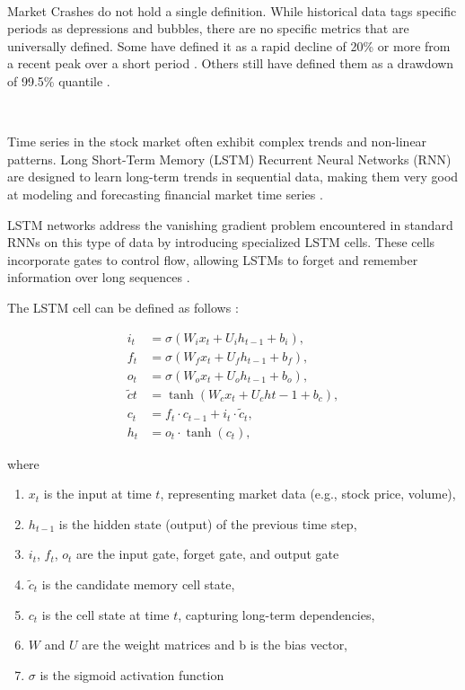\documentclass[12pt, letterpaper]{article}
\begin{document}
    \

    Market Crashes do not hold a single definition. While historical data tags specific periods as depressions and bubbles, there are no specific metrics that are universally defined. Some have defined it as a rapid decline of 20\% or more from a recent peak over a short period \cite{Fonville, Investo}. Others still have defined them as a drawdown of 99.5\% quantile \cite{99.5quantile}.
    
    \
    
    Time series in the stock market often exhibit complex trends and non-linear patterns. 
    Long Short-Term Memory (LSTM) Recurrent Neural Networks (RNN) are designed to learn long-term trends in sequential data, making them very good at modeling and forecasting financial market time series \cite{hochreiter1997, greff2017}.

    LSTM networks address the vanishing gradient problem encountered in standard RNNs on this type of data by introducing specialized LSTM cells. These cells incorporate gates to control flow, allowing LSTMs to forget and remember information over long sequences \cite{hochreiter1997}.

    The LSTM cell can be defined as follows \cite{hochreiter1997}:

\begin{align*} 
    i_t &= \sigma(W_i x_t + U_i h_{t-1} + b_i), \\ f_t &= \sigma(W_f x_t + U_f h_{t-1} + b_f), \\ o_t &= \sigma(W_o x_t + U_o h_{t-1} + b_o), \\ \tilde{c}t &= \tanh(W_c x_t + U_c h{t-1} + b_c), \\ c_t &= f_t \cdot c_{t-1} + i_t \cdot \tilde{c}_t, \\ h_t &= o_t \cdot \tanh(c_t), 
\end{align*}

where

\begin{enumerate}[label=-]
    \item $x_t$ is the input at time $t$, representing market data (e.g., stock price, volume),
    \item $h_{t-1}$ is the hidden state (output) of the previous time step,
    \item $i_t$, $f_t$, $o_t$ are the input gate, forget gate, and output gate
    \item $\tilde{c}_t$ is the candidate memory cell state,
    \item $c_t$ is the cell state at time $t$, capturing long-term dependencies,
    \item $W$ and $U$ are the weight matrices and b is the bias vector,
    \item $\sigma$ is the sigmoid activation function
\end{enumerate}
\end{document}
